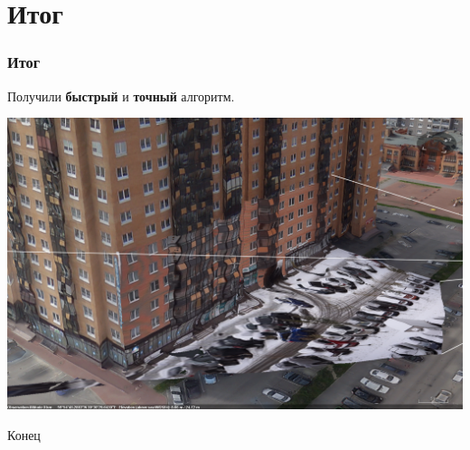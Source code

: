 \documentclass{beamer}
\begin{document}



\section{Итог}

\begin{frame}
\frametitle{Итог}
	\centerline{Получили \textbf{быстрый} и \textbf{точный} алгоритм.}
	
	\centerline{\includegraphics[scale=0.26]{sample.png}}
\end{frame}


\begin{frame}
\Huge{\centerline{Конец}}
\end{frame}

\end{document}
